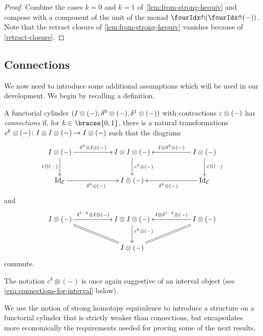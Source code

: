 \documentclass[reqno,10pt,a4paper,oneside,draft]{amsart}
\begin{document}
\begin{proof} Combine the cases $k = 0$ and $k = 1$ of~\cref{lem:from-strong-hequiv} and compose
with  a component of the unit of the monad $\liftl{(\liftr{(-)})}$.  Note that the retract closure of \cref{lem:from-strong-hequiv} vanishes because of \cref{retract-closure}.
\end{proof} 


\subsection*{Connections} We now need to introduce some additional assumptions
which will be used in our development. We begin by recalling a definition.

\begin{definition} \label{def:connections}
A functorial cylinder $(I \otimes (-), \delta^0 \otimes (-), \delta^1 \otimes (-))$ with contractions $\varepsilon \otimes (-)$ has \emph{connections} if, for $k \in \braces{0, 1}$, there is a natural transformations $c^k \otimes (-) \colon I \otimes I \otimes (-) \to I \otimes (-)$ such that the diagrams
\begin{equation} \label{connections:0}
\xymatrix@C+3em{
  \interval \otimes (-)
  \ar[r]^-{\kcyl \otimes \interval \otimes (-)}
  \ar[d]_{\ccyl \otimes (-)}
&
  \interval \otimes \interval \otimes (-)
  \ar[d]^{c^k \otimes (-)}
&
  \interval \otimes (-)
  \ar[l]_-{\interval \otimes \kcyl \otimes (-)}
  \ar[d]^{\ccyl \otimes (-)}
\\
  \Id_\catE
  \ar[r]_{\kcyl \otimes (-)}
&
  \interval \otimes (-)
&
  \Id_\catE
  \ar[l]^{\kcyl \otimes (-)}
}
\end{equation}
and
\begin{equation} \label{connections:1}
\xymatrix@C+3em{
  \interval \otimes (-)
  \ar[r]^-{\kcylinv \otimes \interval \otimes (-)}
  \ar@{=}[dr]
&
  \interval \otimes \interval \otimes (-)
  \ar[d]^(0.4){c^k \otimes (-)}
&
  \interval \otimes (-)
  \ar[l]_-{\interval \otimes \kcylinv \otimes (-)}
  \ar@{=}[dl]
\\&
  \interval \otimes (-)
}
\end{equation}
commute.
\end{definition}

The notation $c^k \otimes (-)$ is once again suggestive of an interval object (see \cref{exa:connections-for-interval} below).

We use the notion of strong homotopy equivalence to introduce a structure on a functorial cylinder that is strictly weaker than connections, but encapsulates more economically the requirements needed for proving some of the next results.
\end{document}
